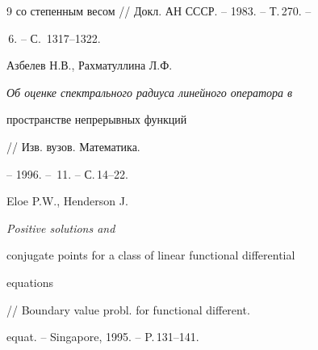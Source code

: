 \begin{thebibliography}{9}
{со степенным весом} // Докл. АН СССР. -- 1983. -- Т.\,270. --


\No\,6. -- С.\, 1317--1322.




Азбелев Н.В., Рахматуллина Л.Ф.


{\em Об оценке спектрального радиуса линейного оператора в


пространстве непрерывных функций} // Изв. вузов. Математика.


-- 1996. -- \No\,11. -- С.\,14--22.




Eloe P.W., Henderson J. {\em Positive solutions and


conjugate points for a class of linear functional differential


equations} // Boundary value probl. for functional different.


equat. -- Singapore, 1995. -- P.\,131--141.





\end{thebibliography}





\vskip 2cm









\smallskip







\label{end}








